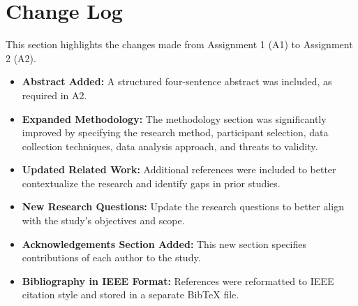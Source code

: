 \section{Change Log}
This section highlights the changes made from Assignment 1 (A1) to Assignment 2 (A2).

\begin{itemize}
    \item \textbf{Abstract Added:} A structured four-sentence abstract was included, as required in A2.
    \item \textbf{Expanded Methodology:} The methodology section was significantly improved by specifying the research method, participant selection, data collection techniques, data analysis approach, and threats to validity.
    \item \textbf{Updated Related Work:} Additional references were included to better contextualize the research and identify gaps in prior studies.
    \item \textbf{New Research Questions:} Update the research questions to better align with the study's objectives and scope.
    \item \textbf{Acknowledgements Section Added:} This new section specifies contributions of each author to the study.
    \item \textbf{Bibliography in IEEE Format:} References were reformatted to IEEE citation style and stored in a separate BibTeX file.
\end{itemize}
